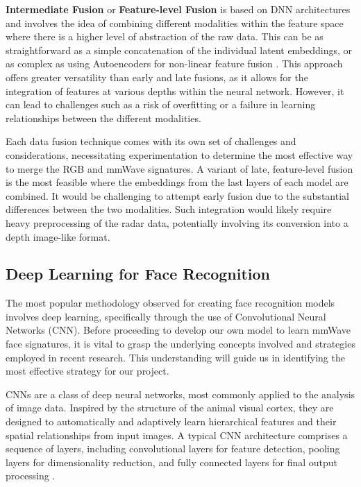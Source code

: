 \documentclass{interim}
\begin{document}
\textbf{Intermediate Fusion} or \textbf{Feature-level Fusion} is based on DNN architectures and involves the idea of combining different modalities within the feature space where there is a higher level of abstraction of the raw data. This can be as straightforward as a simple concatenation of the individual latent embeddings, or as complex as using Autoencoders for non-linear feature fusion \cite{charte2018practical}. This approach offers greater versatility than early and late fusions, as it allows for the integration of features at various depths within the neural network. However, it can lead to challenges such as a risk of overfitting or a failure in learning relationships between the different modalities.

Each data fusion technique comes with its own set of challenges and considerations, necessitating experimentation to determine the most effective way to merge the RGB and mmWave signatures. A variant of late, feature-level fusion is the most feasible where the embeddings from the last layers of each model are combined. It would be challenging to attempt early fusion due to the substantial differences between the two modalities. Such integration would likely require heavy preprocessing of the radar data, potentially involving its conversion into a depth image-like format. 


\subsection{Deep Learning for Face Recognition}
The most popular methodology observed for creating face recognition models involves deep learning, specifically through the use of Convolutional Neural Networks (CNN). Before proceeding to develop our own model to learn mmWave face signatures, it is vital to grasp the underlying concepts involved and strategies employed in recent research. This understanding will guide us in identifying the most effective strategy for our project.

CNNs are a class of deep neural networks, most commonly applied to the analysis of image data. Inspired by the structure of the animal visual cortex, they are designed to automatically and adaptively learn hierarchical features and their spatial relationships from input images. A typical CNN architecture comprises a sequence of layers, including convolutional layers for feature detection, pooling layers for dimensionality reduction, and fully connected layers for final output processing \cite{o2015introduction}.
\end{document}
